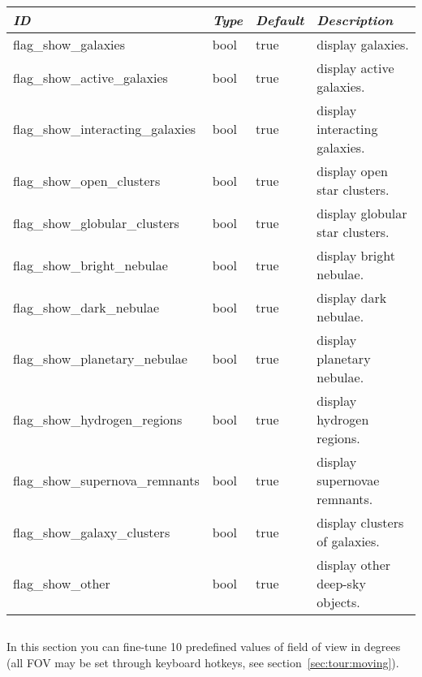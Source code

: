 \noindent%
\begin{tabularx}{\textwidth}{l|l|l|X}\toprule
\emph{ID} & \emph{Type} & \emph{Default} & \emph{Description}\\\midrule
flag\_show\_galaxies              & bool & true & display galaxies.\\%
flag\_show\_active\_galaxies      & bool & true & display active galaxies. \\%
flag\_show\_interacting\_galaxies & bool & true & display interacting galaxies.  \\%
flag\_show\_open\_clusters        & bool & true & display open star clusters.  \\%
flag\_show\_globular\_clusters    & bool & true & display globular star clusters.  \\%
flag\_show\_bright\_nebulae       & bool & true & display bright nebulae.  \\%
flag\_show\_dark\_nebulae         & bool & true & display dark nebulae.  \\%
flag\_show\_planetary\_nebulae    & bool & true & display planetary nebulae.  \\%
flag\_show\_hydrogen\_regions     & bool & true & display hydrogen regions. \\%
flag\_show\_supernova\_remnants   & bool & true & display supernovae remnants. \\%
flag\_show\_galaxy\_clusters      & bool & true & display clusters of galaxies. \\%
flag\_show\_other                 & bool & true & display other deep-sky objects.  \\\bottomrule
\end{tabularx}

\subsection{}
In this section you can fine-tune 10 predefined values of field of view in degrees (all FOV may be set through keyboard hotkeys, see section~\ref{sec:tour:moving}).

